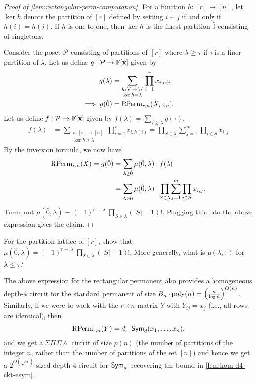 \begin{proof}[Proof of \cref{lem:rectangular-perm-computation}]
  For a function $h:[r]\rightarrow [n]$, let $\ker h$ denote the partition of $[r]$ defined by setting $i \sim j$ if and only if $h(i) = h(j)$. If $h$ is one-to-one, then $\ker h$ is the finest partition $\hat{0}$ consisting of singletons. 

  Consider the poset $\mathcal{P}$ consisting of partitions of $[r]$ where $\lambda \geq \tau$ if $\tau$ is a finer partition of $\lambda$. Let us define $g: \mathcal{P} \rightarrow \mathbb{F}[\mathbf{x}]$ given by 
  \begin{align*}
    g(\lambda) & = \sum_{\substack{h: [r] \rightarrow [n]\\ \ker h = \lambda}} \prod_{i=1}^r x_{i, h(i)}\\
    \implies g(\hat{0}) & = \operatorname{\mathrm{RPerm}}_{r,n}(X_{r\times n}).
  \end{align*}
  Let us define $f: \mathcal{P} \rightarrow \mathbb{F}[\mathbf{x}]$ given by $f(\lambda) = \sum_{\tau \geq \lambda} g(\tau)$.
  \begin{align*}
  f(\lambda) & = \sum_{\substack{h: [r] \rightarrow [n]\\ \ker h \geq \lambda}} \prod_{i=1}^r x_{i, h(i)} = \prod_{S \in \lambda} \sum_{j=1}^m \prod_{i\in S} x_{i, j}
  \end{align*}
  By the \Mobius{} inversion formula, we now have
  \begin{align*}
    \operatorname{\mathrm{RPerm}}_{r,n}(X) = g(\hat{0}) & = \sum_{\lambda \geq \hat{0}} \mu(\hat{0}, \lambda) \cdot f(\lambda)\\
                                 & = \sum_{\lambda \geq \hat{0}} \mu(\hat{0}, \lambda) \cdot \prod_{S \in \lambda} \sum_{j=1}^m \prod_{i\in S} x_{i, j}.
  \end{align*}
  Turns out $\mu(\hat{0}, \lambda) = (-1)^{r - |\lambda|} \prod_{S \in \lambda} (|S| - 1)!$. Plugging this into the above expression gives the claim. 
\end{proof}

\begin{exercise}
For the partition lattice of $[r]$, show that $\mu(\hat{0}, \lambda) = (-1)^{r - |\lambda|} \prod_{S \in \lambda} (|S| - 1)!$. More generally, what is $\mu(\lambda, \tau)$ for $\lambda \leq \tau$?
\end{exercise}


The above expression for the rectangular permanent also provides a homogeneous depth-$4$ circuit for the standard permanent of size $B_n \cdot \operatorname{poly}(n) = \left(\frac{n}{\log n}\right)^{O(n)}$. Similarly, if we were to work with the $r \times n$ matrix $Y$ with $Y_{ij} = x_j$ (i.e., all rows are identical), then 
\[
\operatorname{\mathrm{RPerm}}_{r,n}(Y) = d! \cdot \operatorname{\mathsf{Sym}}_d(x_1,\ldots, x_n),
\]
and we get a $\Sigma\Pi\Sigma\wedge$ circuit of size $p(n)$ (the number of partitions of the integer $n$, rather than the number of partitions of the set $[n]$) and hence we get a $2^{O(\sqrt{n})}$-sized depth-$4$ circuit for $\operatorname{\mathsf{Sym}}_d$, recovering the bound in \cref{lem:hom-d4-ckt-esym}. 
